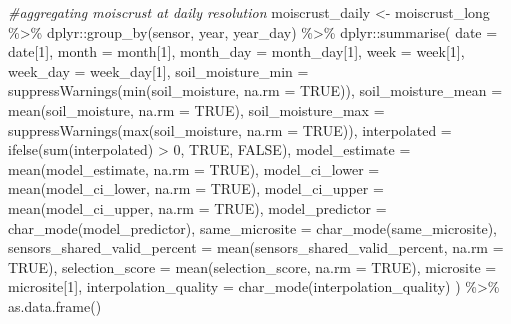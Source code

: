 \documentclass[
  table]{article}
\newenvironment{Shaded}{\begin{snugshade}}{\end{snugshade}}
\newcommand{\AttributeTok}[1]{\textcolor[rgb]{0.77,0.63,0.00}{#1}}
\newcommand{\CommentTok}[1]{\textcolor[rgb]{0.56,0.35,0.01}{\textit{#1}}}
\newcommand{\ConstantTok}[1]{\textcolor[rgb]{0.00,0.00,0.00}{#1}}
\newcommand{\DecValTok}[1]{\textcolor[rgb]{0.00,0.00,0.81}{#1}}
\newcommand{\FunctionTok}[1]{\textcolor[rgb]{0.00,0.00,0.00}{#1}}
\newcommand{\NormalTok}[1]{#1}
\newcommand{\OtherTok}[1]{\textcolor[rgb]{0.56,0.35,0.01}{#1}}
\newcommand{\SpecialCharTok}[1]{\textcolor[rgb]{0.00,0.00,0.00}{#1}}
\begin{document}
\begin{Shaded}
\begin{Highlighting}[]
\CommentTok{\#aggregating moiscrust at daily resolution}
\NormalTok{moiscrust\_daily }\OtherTok{\textless{}{-}}\NormalTok{ moiscrust\_long }\SpecialCharTok{\%\textgreater{}\%} 
\NormalTok{  dplyr}\SpecialCharTok{::}\FunctionTok{group\_by}\NormalTok{(sensor, year, year\_day) }\SpecialCharTok{\%\textgreater{}\%} 
\NormalTok{  dplyr}\SpecialCharTok{::}\FunctionTok{summarise}\NormalTok{(}
    \AttributeTok{date =}\NormalTok{ date[}\DecValTok{1}\NormalTok{],}
    \AttributeTok{month =}\NormalTok{ month[}\DecValTok{1}\NormalTok{],}
    \AttributeTok{month\_day =}\NormalTok{ month\_day[}\DecValTok{1}\NormalTok{],}
    \AttributeTok{week =}\NormalTok{ week[}\DecValTok{1}\NormalTok{],}
    \AttributeTok{week\_day =}\NormalTok{ week\_day[}\DecValTok{1}\NormalTok{],}
    \AttributeTok{soil\_moisture\_min =} \FunctionTok{suppressWarnings}\NormalTok{(}\FunctionTok{min}\NormalTok{(soil\_moisture, }\AttributeTok{na.rm =} \ConstantTok{TRUE}\NormalTok{)),}
    \AttributeTok{soil\_moisture\_mean =} \FunctionTok{mean}\NormalTok{(soil\_moisture, }\AttributeTok{na.rm =} \ConstantTok{TRUE}\NormalTok{),}
    \AttributeTok{soil\_moisture\_max =} \FunctionTok{suppressWarnings}\NormalTok{(}\FunctionTok{max}\NormalTok{(soil\_moisture, }\AttributeTok{na.rm =} \ConstantTok{TRUE}\NormalTok{)),}
    \AttributeTok{interpolated =} \FunctionTok{ifelse}\NormalTok{(}\FunctionTok{sum}\NormalTok{(interpolated) }\SpecialCharTok{\textgreater{}} \DecValTok{0}\NormalTok{, }\ConstantTok{TRUE}\NormalTok{, }\ConstantTok{FALSE}\NormalTok{),}
    \AttributeTok{model\_estimate =} \FunctionTok{mean}\NormalTok{(model\_estimate, }\AttributeTok{na.rm =} \ConstantTok{TRUE}\NormalTok{),}
    \AttributeTok{model\_ci\_lower =} \FunctionTok{mean}\NormalTok{(model\_ci\_lower, }\AttributeTok{na.rm =} \ConstantTok{TRUE}\NormalTok{),}
    \AttributeTok{model\_ci\_upper =} \FunctionTok{mean}\NormalTok{(model\_ci\_upper, }\AttributeTok{na.rm =} \ConstantTok{TRUE}\NormalTok{),}
    \AttributeTok{model\_predictor =} \FunctionTok{char\_mode}\NormalTok{(model\_predictor),}
    \AttributeTok{same\_microsite =} \FunctionTok{char\_mode}\NormalTok{(same\_microsite),}
    \AttributeTok{sensors\_shared\_valid\_percent =} \FunctionTok{mean}\NormalTok{(sensors\_shared\_valid\_percent, }\AttributeTok{na.rm =} \ConstantTok{TRUE}\NormalTok{),}
    \AttributeTok{selection\_score =} \FunctionTok{mean}\NormalTok{(selection\_score, }\AttributeTok{na.rm =} \ConstantTok{TRUE}\NormalTok{),}
    \AttributeTok{microsite =}\NormalTok{ microsite[}\DecValTok{1}\NormalTok{],}
    \AttributeTok{interpolation\_quality =} \FunctionTok{char\_mode}\NormalTok{(interpolation\_quality)}
\NormalTok{  ) }\SpecialCharTok{\%\textgreater{}\%} 
  \FunctionTok{as.data.frame}\NormalTok{()}


\end{Highlighting}
\end{Shaded}
\end{document}
